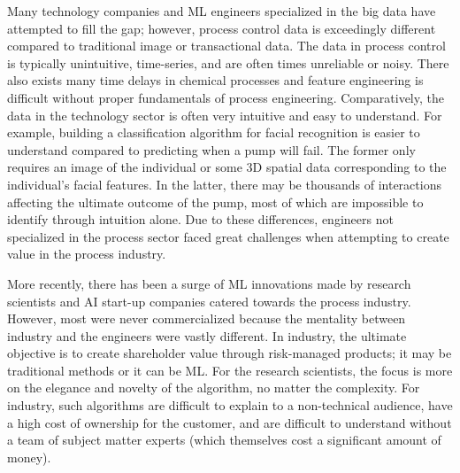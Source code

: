 Many technology companies and ML engineers specialized in the big data have attempted to fill the gap; however, process control data is exceedingly different compared to traditional image or transactional data.  The data in process control is typically unintuitive, time-series, and are often times unreliable or noisy. There also exists many time delays in chemical processes and feature engineering is difficult without proper fundamentals of process engineering. Comparatively, the data in the technology sector is often very intuitive and easy to understand.  For example, building a classification algorithm for facial recognition is easier to understand compared to predicting when a pump will fail.  The former only requires an image of the individual or some 3D spatial data corresponding to the individual's facial features. In the latter, there may be thousands of interactions affecting the ultimate outcome of the pump, most of which are impossible to identify through intuition alone. Due to these differences, engineers not specialized in the process sector faced great challenges when attempting to create value in the process industry.

More recently, there has been a surge of ML innovations made by research scientists and AI start-up companies catered towards the process industry.  However, most were never commercialized because the mentality between industry and the engineers were vastly different.  In industry, the ultimate objective is to create shareholder value through risk-managed products; it may be traditional methods or it can be ML.  For the research scientists, the focus is more on the elegance and novelty of the algorithm, no matter the complexity. For industry, such algorithms are difficult to explain to a non-technical audience, have a high cost of ownership for the customer, and are difficult to understand without a team of subject matter experts (which themselves cost a significant amount of money).

